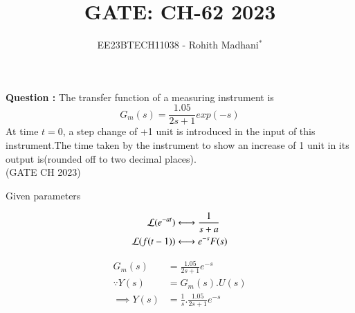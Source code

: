 \documentclass[journal,12pt,twocolumn]{IEEEtran}
\theoremstyle{remark}
\begin{document}

\vspace{3cm}

\title{GATE: CH-62 2023}
\author{EE23BTECH11038 - Rohith Madhani$^{*}$%
}
\maketitle
\newpage
\bigskip
\renewcommand{\thefigure}{\theenumi}
\renewcommand{\thetable}{\theenumi}

\textbf{Question :} The transfer function of a measuring instrument is \\
$$G_m(s) = \frac{1.05}{2s+1}exp(-s)$$
At time $t = 0$, a step change of +1 unit is introduced in the input of this instrument.The time taken by the instrument to show an increase of 1 unit in its output is(rounded off to two decimal places). \\ \hfill(GATE CH 2023) \\
\solution

\begin{table}[!h] 
\centering

\caption{Given parameters}
\label{table:gate23ch62}
\end{table}

\begin{align}
    \mathcal{L}(e^{-at}) &\system{} \frac{1}{s+a} \label{eq:LaplaceTransform1} \\
    \mathcal{L}(f(t-1)) &\system{} e^{-s}F(s) \label{eq:LaplaceTransform2}
\end{align}


\begin{align}
    G_m(s) &= \frac{1.05}{2s+1}e^{-s} \\
    \because Y(s) &= G_m(s).U(s) \\
    \implies Y(s) &= \frac{1}{s}.\frac{1.05}{2s+1}e^{-s}
\end{align}
\end{document}
